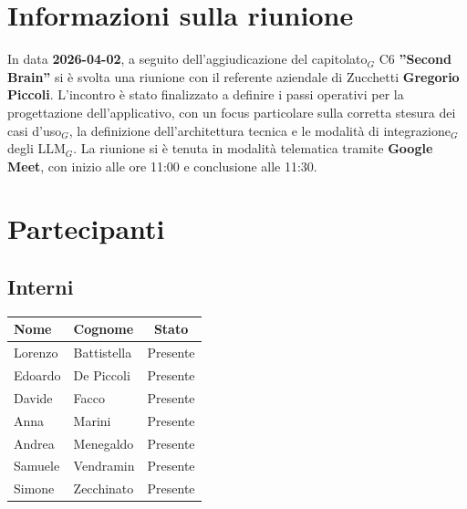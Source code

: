 \documentclass[a4paper, 10pt, colorlinks=true, linkcolor=black, urlcolor=blue, citecolor=blue, hidelinks]{article}
\begin{document}
\newcommand{\tipoverbale}{esterno}
\newcommand{\titolo}{Verbale esterno}
\newcommand{\dataverbale}{2026-04-02}
\newcommand{\dataversione}{2026-04-02}
\newcommand{\versione}{1.0.0}
\newcommand{\stato}{Approvato}
\newcommand{\destinatari}{The Bitless, prof. T. Vardanega, prof. R. Cardin, Zucchetti}




\newpage

\tableofcontents


\newpage
\section{Informazioni sulla riunione}
In data \textbf{\dataverbale}, a seguito dell'aggiudicazione del capitolato$_G$ C6 \textbf{''Second Brain''} si è svolta una riunione con il referente aziendale di Zucchetti \textbf{Gregorio Piccoli}. L'incontro è stato finalizzato a definire i passi operativi per la progettazione dell'applicativo, con un focus particolare sulla corretta stesura dei casi d'uso$_G$, la definizione dell'architettura tecnica e le modalità di integrazione$_G$ degli LLM$_G$. La riunione si è tenuta in modalità telematica tramite \textbf{Google Meet}, con inizio alle ore 11:00 e conclusione alle 11:30.
\section{Partecipanti}

\subsection{Interni}
\begin{center}
\begin{tabular}{|l|l|c|}
\hline
\textbf{Nome} & \textbf{Cognome} & \textbf{Stato} \\
\hline
Lorenzo & Battistella & Presente \\
Edoardo & De Piccoli & Presente \\
Davide & Facco & Presente \\
Anna & Marini & Presente \\
Andrea & Menegaldo & Presente \\
Samuele & Vendramin & Presente \\
Simone & Zecchinato & Presente \\
\hline
\end{tabular}
\end{center}
\end{document}
